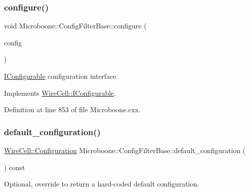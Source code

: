 \subsubsection{\texorpdfstring{configure()}{configure()}}
{\footnotesize\ttfamily void Microboone\+::\+Config\+Filter\+Base\+::configure (\begin{DoxyParamCaption}\item[{const \hyperlink{namespace_wire_cell_a9f705541fc1d46c608b3d32c182333ee}{Wire\+Cell\+::\+Configuration} \&}]{config }\end{DoxyParamCaption})\hspace{0.3cm}{\ttfamily [virtual]}}



\hyperlink{class_wire_cell_1_1_i_configurable}{I\+Configurable} configuration interface. 



Implements \hyperlink{class_wire_cell_1_1_i_configurable_a57ff687923a724093df3de59c6ff237d}{Wire\+Cell\+::\+I\+Configurable}.



Definition at line 853 of file Microboone.\+cxx.

\mbox{\label{class_wire_cell_1_1_sig_proc_1_1_microboone_1_1_config_filter_base_a4795943bb21fa1857b5a566f86be67ac}} 
\subsubsection{\texorpdfstring{default\+\_\+configuration()}{default\_configuration()}}
{\footnotesize\ttfamily \hyperlink{namespace_wire_cell_a9f705541fc1d46c608b3d32c182333ee}{Wire\+Cell\+::\+Configuration} Microboone\+::\+Config\+Filter\+Base\+::default\+\_\+configuration (\begin{DoxyParamCaption}{ }\end{DoxyParamCaption}) const\hspace{0.3cm}{\ttfamily [virtual]}}



Optional, override to return a hard-\/coded default configuration. 



